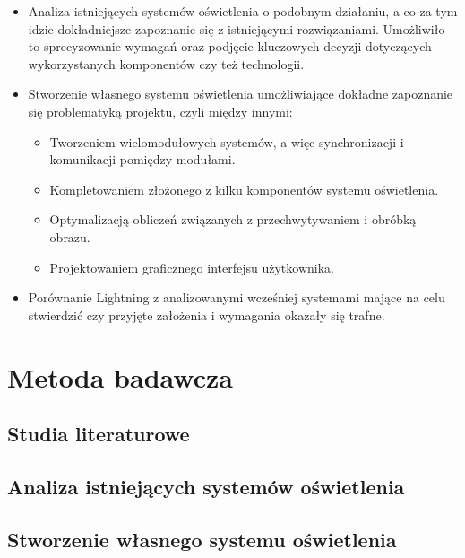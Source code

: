 \documentclass[12pt]{report}
\begin{document}
\begin{itemize}
	\item Analiza istniejących systemów oświetlenia o podobnym działaniu, a co za tym idzie dokładniejsze zapoznanie się z istniejącymi rozwiązaniami. Umożliwiło to sprecyzowanie wymagań oraz podjęcie kluczowych decyzji do\-tyczą\-cych wykorzystanych komponentów czy też technologii.
	\item Stworzenie własnego systemu oświetlenia umożliwiające dokładne zapoznanie się problematyką projektu, czyli między innymi:
	\begin{itemize}
		\item Tworzeniem wielomodułowych systemów, a więc synchronizacji i komunikacji pomiędzy modułami.
		\item Kompletowaniem złożonego z kilku komponentów systemu oświetlenia.
		\item Optymalizacją obliczeń związanych z przechwytywaniem i obróbką obrazu.
		\item Projektowaniem graficznego interfejsu użytkownika.
	\end{itemize}
	\item Porównanie Lightning z analizowanymi wcześniej systemami mające na celu stwierdzić czy przyjęte założenia i wymagania okazały się trafne.
\end{itemize}

\section{Metoda badawcza}

\subsection{Studia literaturowe}


\subsection{Analiza istniejących systemów oświetlenia}


\subsection{Stworzenie własnego systemu oświetlenia}

\end{document}
